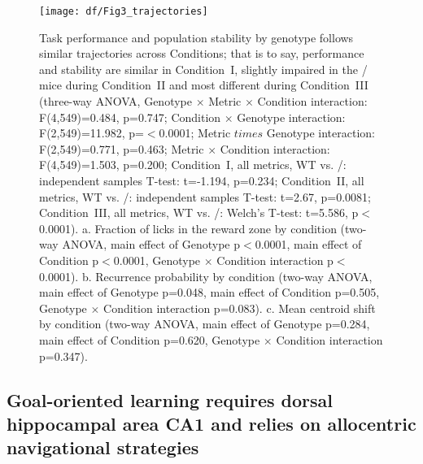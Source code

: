 \begin{figure}
	\centering
	\texttt{[image: df/Fig3\_trajectories]}
	\caption[Task performance and population stability follow similar trajectories across Conditions]{Task performance and population stability by genotype follows similar trajectories across Conditions; that is to say, performance and stability are similar in Condition~I, slightly impaired in the \df/ mice during Condition~II and most different during Condition~III (three-way ANOVA, Genotype $\times$ Metric $\times$ Condition interaction: F(4,549)=0.484, p=0.747; Condition $\times$ Genotype interaction: F(2,549)=11.982, p=$<$0.0001; Metric $times$ Genotype interaction: F(2,549)=0.771, p=0.463; Metric $\times$ Condition interaction: F(4,549)=1.503, p=0.200; Condition~I, all metrics, WT vs. \df/: independent samples T-test: t=-1.194, p=0.234; Condition~II, all metrics, WT vs. \df/: independent samples T-test: t=2.67, p=0.0081; Condition~III, all metrics, WT vs. \df/: Welch's T-test: t=5.586, p$<$0.0001). a. Fraction of licks in the reward zone by condition (two-way ANOVA, main effect of Genotype p$<$0.0001, main effect of Condition p$<$0.0001, Genotype $\times$ Condition interaction p$<$0.0001). b. Recurrence probability by condition (two-way ANOVA, main effect of Genotype p=0.048, main effect of Condition p=0.505, Genotype $\times$ Condition interaction p=0.083). c. Mean centroid shift by condition (two-way ANOVA, main effect of Genotype p=0.284, main effect of Condition p=0.620, Genotype $\times$ Condition interaction p=0.347).}
	\label{fig:df:trajectories}
\end{figure}

\subsection{Goal-oriented learning requires dorsal hippocampal area CA1 and relies on allocentric navigational strategies}

